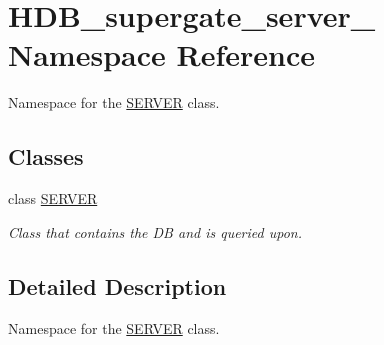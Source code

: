 \hypertarget{namespaceHDB__supergate__server__}{}\section{H\+D\+B\+\_\+supergate\+\_\+server\+\_\+ Namespace Reference}
\label{namespaceHDB__supergate__server__}


Namespace for the \hyperlink{classHDB__supergate__server___1_1SERVER}{S\+E\+R\+V\+ER} class.  


\subsection*{Classes}
\begin{DoxyCompactItemize}
\item 
class \hyperlink{classHDB__supergate__server___1_1SERVER}{S\+E\+R\+V\+ER}
\begin{DoxyCompactList}\small\item\em Class that contains the DB and is queried upon. \end{DoxyCompactList}\end{DoxyCompactItemize}


\subsection{Detailed Description}
Namespace for the \hyperlink{classHDB__supergate__server___1_1SERVER}{S\+E\+R\+V\+ER} class. 